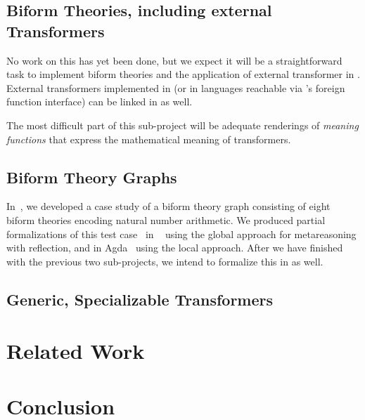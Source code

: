 \documentclass[fleqn]{llncs}
\begin{document}
\subsection*{Biform Theories, including external Transformers}

No work on this has yet been done, but we expect it will be a
straightforward task to implement biform theories and the application
of external transformer in {\HLQE}.  External transformers
implemented in {\OCAML} (or in languages reachable via {\OCAML}'s foreign
function interface) can be linked in as well.

The most difficult part of this sub-project will be adequate
renderings of \emph{meaning functions} that express the mathematical
meaning of transformers.

\subsection*{Biform Theory Graphs}

In~\cite{CaretteFaerm17}, we developed a case study of a biform
theory graph consisting of eight biform theories encoding natural number
arithmetic.  We produced partial formalizations of this test
case~\cite{CaretteFarmer17} in {\churchuqe}~\cite{Farmer17} using the
global approach for metareasoning with reflection, and in
Agda~\cite{Norell07,Norell09} using the local approach.  After we have
finished with the previous two sub-projects, we intend to formalize this
in {\HLQE} as well.

\subsection*{Generic, Specializable Transformers}


\section{Related Work}


\section{Conclusion}




\setcounter{tocdepth}{1}
\listoftodos
\setcounter{tocdepth}{0}
\end{document}
